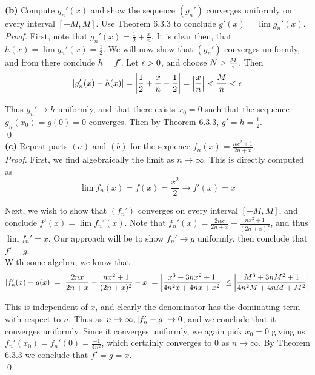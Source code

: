 \documentclass{exam}
\begin{document}
\begin{questions}
\textbf{(b) } Compute $g_n'(x)$ and show the sequence $(g_n')$ converges uniformly on every interval $[-M, M]$. Use Theorem 6.3.3 to conclude $g'(x) = \lim g_n'(x)$. \\

\textit{Proof. }
First, note that $g_n'(x) = \frac{1}{2} + \frac{x}{n}$. It is clear then, that $h(x) = \lim g_n'(x) = \frac{1}{2}$. We will now show that $(g_n')$ converges uniformly, and from there conclude $h = f'$. Let $\epsilon > 0$, and choose $N > \frac{M}{\epsilon}$. Then
$$\left| g_n'(x) - h(x) \right| = \left| \frac{1}{2} + \frac{x}{n} - \frac{1}{2} \right| = \left| \frac{x}{n} \right| < \frac{M}{n} < \epsilon$$

Thus $g_n' \rightarrow h$ uniformly, and that there exists $x_0 = 0$ such that the sequence $g_n(x_0) = g(0) = 0$ converges. Then by Theorem 6.3.3, $g' = h = \frac{1}{2}$. \\ \qed \\

\textbf{(c) } Repeat parts $(a) \text{ and } (b)$  for the sequence $f_n(x) = \frac{nx^2 + 1}{2n + x}$. \\

\textit{Proof. } 
First, we find algebraically the limit as $n \rightarrow \infty$. This is directly computed as
$$\lim f_n(x) = f(x) = \frac{x^2}{2} \longrightarrow f'(x) = x$$

Next, we wish to show that $(f_n')$ converges on every interval $[-M, M]$, and conclude $f'(x) = \lim f_n'(x)$. Note that $f_n'(x) = \frac{2nx}{2n + x} - \frac{nx^2 + 1}{(2n + x)^2}$, and thus $\lim f_n' = x$. Our approach will be to show $f_n' \rightarrow g$ uniformly, then conclude that $f' = g$. \\

With some algebra, we know that
$$\left| f_n'(x) - g(x) \right| = \left| \frac{2nx}{2n + x} - \frac{nx^2 + 1}{(2n + x)^2} - x \right| = \left| \frac{x^3 + 3nx^2 + 1}{4n^2x + 4nx + x^2} \right| \leq \left| \frac{M^3 + 3nM^2 + 1}{4n^2M + 4nM + M^2} \right|$$

This is independent of $x$, and clearly the denominator has the dominating term with respect to $n$. Thus as $n \rightarrow \infty, \left| f_n' - g \right| \rightarrow 0$, and we conclude that it converges uniformly. Since it converges uniformly, we again pick $x_0 = 0$ giving us $f_n'(x_0) = f_n'(0) = \frac{-1}{4n^2}$, which certainly converges to 0 as $n \rightarrow \infty$. By Theorem 6.3.3 we conclude that $f' = g = x$. \\ \qed
\end{questions}
\end{document}

